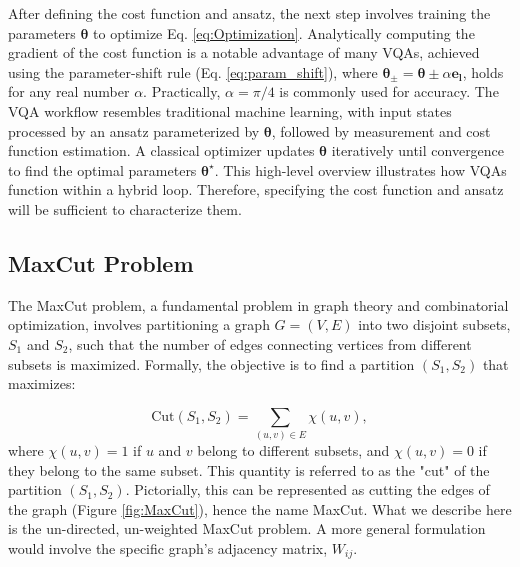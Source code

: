  After defining the cost function and ansatz, the next step involves training the parameters \(\boldsymbol{\theta}\) to optimize Eq. \ref{eq:Optimization}. Analytically computing the gradient of the cost function is a notable advantage of many VQAs, achieved using the parameter-shift rule (Eq. \ref{eq:param_shift}), where \(\boldsymbol{\theta_{\pm}} = \boldsymbol{\theta} \pm \alpha \boldsymbol{e_l}\), holds for any real number \(\alpha\). Practically, \(\alpha = \pi/4\) is commonly used for accuracy. The VQA workflow resembles traditional machine learning, with input states processed by an ansatz parameterized by \(\boldsymbol{\theta}\), followed by measurement and cost function estimation. A classical optimizer updates \(\boldsymbol{\theta}\) iteratively until convergence to find the optimal parameters \(\boldsymbol{\theta}^{\star}\). This high-level overview illustrates how VQAs function within a hybrid loop. Therefore, specifying the cost function and ansatz will be sufficient to characterize them.


\subsection{MaxCut Problem}
\label{sec: MaxCut}
The MaxCut problem, a fundamental problem in graph theory and combinatorial optimization, involves partitioning a graph \( G = (V, E) \) into two disjoint subsets, \( S_1 \) and \( S_2 \), such that the number of edges connecting vertices from different subsets is maximized. Formally, the objective is to find a partition \( (S_1, S_2) \) that maximizes:

\begin{equation}\label{eq:Cut}
\text{Cut}(S_1, S_2) = \sum_{(u, v) \in E} \chi(u, v),
\end{equation}
where \( \chi(u, v) = 1 \) if \( u \) and \( v \) belong to different subsets, and \( \chi(u, v) = 0 \) if they belong to the same subset. This quantity is referred to as the "cut" of the partition $(S_1, S_2)$. Pictorially, this can be represented as cutting the edges of the graph (Figure \ref{fig:MaxCut}), hence the name MaxCut. What we describe here is the un-directed, un-weighted MaxCut problem. A more general formulation would involve the specific graph's adjacency matrix, $W_{ij}$.

